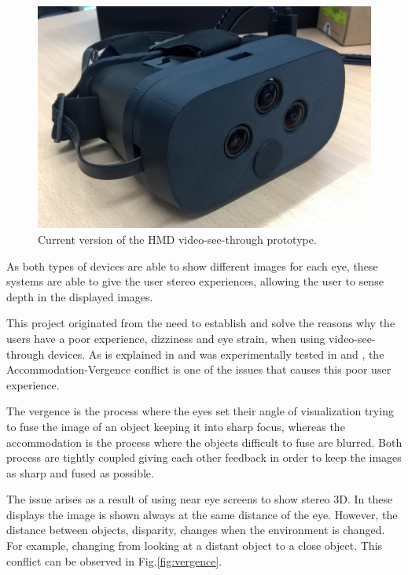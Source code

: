 \documentclass[10pt,a4paper,twocolumn,twoside]{article}
\begin{document}
	\begin{figure}
		\centering
		\includegraphics[width=1\linewidth]{img/imagenproto3.jpg}
		\caption{Current version of the HMD video-see-through prototype.}
		\label{fig:proto}
	\end{figure}
	
	As both types of devices are able to show different images for each eye, these systems are able to give the user stereo experiences, allowing the user to sense depth in the displayed images. 
	
	This project originated from the need to establish and solve the reasons why the users have a poor experience, dizziness and eye strain, when using video-see-through devices. As is explained in \cite{disconfortReview} and was experimentally tested in \cite{vergenceDisconfort} and \cite{shiomiaccomodation}, the Accommodation-Vergence conflict is one of the issues that causes this poor user experience.
	
	The vergence is the process where the eyes set their angle of visualization trying to fuse the image of an object keeping it into sharp focus, whereas the accommodation is the process where the objects difficult to fuse are blurred. Both process are tightly coupled giving each other feedback in order to keep the images as sharp and fused as possible. 
	
	The issue arises as a result of using near eye screens to show stereo 3D. In these displays the image is shown always at the same distance of the eye. However, the distance between objects, disparity,  changes when the environment is changed. For example, changing from looking at a distant object to a close object.  This conflict can be observed in Fig.\ref{fig:vergence}.
	
\end{document}

